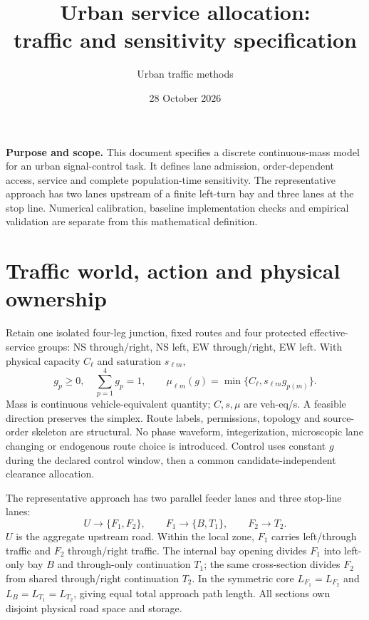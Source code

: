 \documentclass[10pt,a4paper]{article}
\title{Urban service allocation:\\traffic and sensitivity specification}
\author{Urban traffic methods}
\date{28 October 2026}
\begin{document}
\maketitle

\textbf{Purpose and scope.}
This document specifies a discrete continuous-mass model for an urban
signal-control task. It defines lane admission, order-dependent access,
service and complete population-time sensitivity. The representative
approach has two lanes upstream of a finite left-turn bay and three lanes
at the stop line. Numerical calibration, baseline implementation checks
and empirical validation are separate from this mathematical definition.

\section{Traffic world, action and physical ownership}

Retain one isolated four-leg junction, fixed routes and four protected
effective-service groups: NS through/right, NS left, EW through/right,
EW left. With physical capacity $C_\ell$ and saturation $s_{\ell m}$,
\begin{equation}
 g_p\geq0,\quad \sum_{p=1}^4g_p=1,\qquad
 \mu_{\ell m}(g)=\min\{C_\ell,s_{\ell m}g_{p(m)}\}.
 \label{eq:action}
\end{equation}
Mass is continuous vehicle-equivalent quantity; $C,s,\mu$ are veh-eq/s.
A feasible direction preserves the simplex. Route labels, permissions,
topology and source-order skeleton are structural. No phase waveform,
integerization, microscopic lane changing or endogenous route choice is
introduced. Control uses constant $g$ during the declared control window,
then a common candidate-independent clearance allocation.

The representative approach has two parallel feeder lanes and three
stop-line lanes:
\begin{equation}
 U\longrightarrow\{F_1,F_2\},\qquad
 F_1\longrightarrow\{B,T_1\},\qquad F_2\longrightarrow T_2 .
 \label{eq:geometry}
\end{equation}
$U$ is the aggregate upstream road. Within the local zone, $F_1$ carries
left/through traffic and $F_2$ through/right traffic. The internal bay
opening divides $F_1$ into left-only bay $B$ and through-only continuation
$T_1$; the same cross-section divides $F_2$ from shared through/right
continuation $T_2$. In the symmetric core
$L_{F_1}=L_{F_2}$ and $L_B=L_{T_1}=L_{T_2}$, giving equal total approach
path length. All sections own disjoint physical road space and storage.
\end{document}
